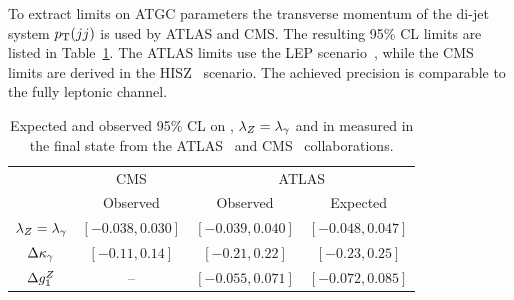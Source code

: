 \begin{table}[htp]
\begin{center}
\caption{Summary of measured total $\WZ+\WW$ production cross sections from ATLAS and CMS
at 7 TeV center-of-mass energy in the \WVlvqq\; final state.}
\end{center}
\label{tab:sss-lvjjVVprod-xsec}
\end{table}

%

To extract limits on ATGC parameters the transverse momentum of the di-jet system $p_{\mathrm{T}}(jj)$ is used 
by ATLAS and CMS. The resulting 95\% CL limits are listed in Table~\ref{tab:sss-lvjjVVprod-ATGC}. The ATLAS
limits use the LEP scenario~\cite{Gounaris:1996rz}, while the CMS limits are derived in the HISZ~\cite{HAGIWARA1992353,PhysRevD.48.2182} scenario. The achieved precision is comparable to the fully leptonic
channel.

\begin{table}\centering
\begin{tabular}{cccc}
\hline
 & CMS & \multicolumn{2}{c}{ATLAS}   \\ 
 & Observed & Observed & Expected \\
\hline
$\lambda_Z=\lambda_\gamma$ & $[-0.038, 0.030]$ & $[-0.039, 0.040]$ & $[-0.048, 0.047]$ \\
$\Delta \kappa_\gamma$ 	  & $[-0.11, 0.14]$ & $[-0.21,0.22]$ & $[-0.23,0.25]$ \\
$\Delta g_1^Z$   & \--- & $[-0.055, 0.071]$ & $[-0.072, 0.085]$ \\
\hline
\end{tabular}
\caption{Expected and observed 95\% CL on \dkg, $\lambda_Z=\lambda_\gamma$ and \dgz in measured in the 
\WVlvqq\; final state from the ATLAS~\cite{Aad:2014mda} and CMS~\cite{Chatrchyan:2012bd} 
collaborations.}
\label{tab:sss-lvjjVVprod-ATGC}
\end{table}


